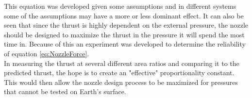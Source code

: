 This equation was developed given some assumptions and in different systems some of the assumptions may have a more or less dominant effect. It can also be seen that since the thrust is highly dependent on the external pressure, the nozzle should be designed to maximize the thrust in the pressure it will spend the most time in. Because of this an experiment was developed to determine the reliability of equation \ref{eq:NozzleForce}.\\
In measuring the thrust at several different area ratios and comparing it to the predicted thrust, the hope is to create an "effective" proportionality constant. This would then allow the nozzle design process to be maximized for pressures that cannot be tested on Earth's surface.

